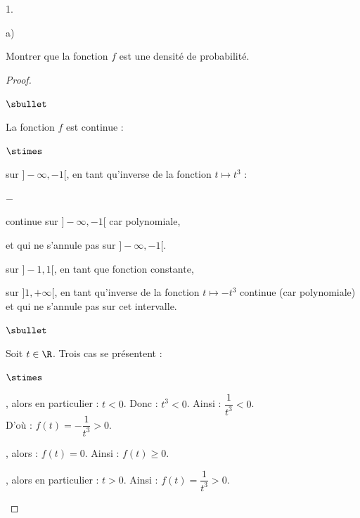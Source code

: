 \documentclass[11pt]{article}%
\begin{document}
\begin{noliste}{1.}
\begin{noliste}{a)}
    \newpage
    

  \item Montrer que la fonction $f$ est une densité de probabilité.

    \begin{proof}~
      \begin{noliste}{$\sbullet$}
      \item La fonction $f$ est continue : \\[-.6cm]
      \end{noliste}
      \begin{liste}{$\stimes$}
      \item sur $]-\infty, -1[$, en tant qu'inverse de la fonction $t
        \mapsto t^3$ :
        \begin{noliste}{$-$}
        \item continue sur $]-\infty, -1[$ car polynomiale,
        \item et qui ne s'annule pas sur $]-\infty, -1[$.
        \end{noliste}
          
      \item sur $]-1,1[$, en tant que fonction constante,
          
      \item sur $]1,+\infty[$, en tant qu'inverse de la fonction $t
        \mapsto -t^3$ continue (car polynomiale) et qui ne s'annule
        pas sur cet intervalle.
      \end{liste}
        
      \begin{noliste}{$\sbullet$}
      \item Soit $t \in \R$. Trois cas se présentent :
        \begin{noliste}{$\stimes$}
        \item \dashuline{si $t \in \ ]-\infty, -1]$}, alors en
          particulier : $t < 0$. Donc : $t^3 < 0$. Ainsi :
          $\dfrac{1}{t^3} <0$.\\
          D'où : $f(t) = - \dfrac{1}{t^3} >0$.
          
        \item \dashuline{si $t \in \ ]-1,1[$}, alors : $f(t) =
          0$. Ainsi : $f(t) \geq 0$.
          
        \item \dashuline{si $t \in [1,+\infty[$}, alors en particulier
          : $t>0$. Ainsi : $f(t) = \dfrac{1}{t^3} >0$.
        \end{noliste}
        

\end{noliste}
\end{proof}
\end{noliste}
\end{noliste}
\end{document}
